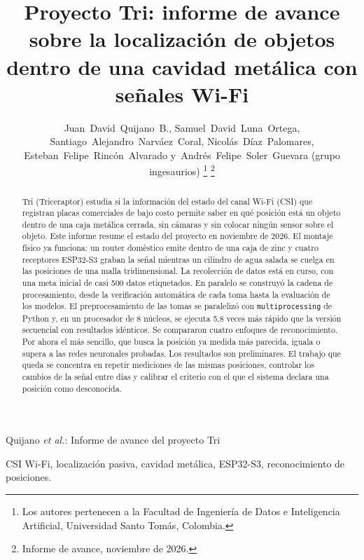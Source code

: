 \documentclass[10pt,journal]{IEEEtran}
\begin{document}
\title{Proyecto Tri: informe de avance sobre la localización de objetos dentro de una cavidad metálica con señales Wi-Fi}

\author{Juan~David~Quijano~B., Samuel~David~Luna~Ortega, Santiago~Alejandro~Narváez~Coral,
        Nicolás~Díaz~Palomares, Esteban~Felipe~Rincón~Alvarado
        y~Andrés~Felipe~Soler~Guevara (grupo ingesaurios)%
\thanks{Los autores pertenecen a la Facultad de Ingeniería de Datos e Inteligencia Artificial, Universidad Santo Tomás, Colombia.}%
\thanks{Informe de avance, noviembre de 2026.}}

%
{Quijano \MakeLowercase{\textit{et al.}}: Informe de avance del proyecto Tri}

\maketitle

\begin{abstract}
Tri (Triceraptor) estudia si la información del estado del canal Wi-Fi (CSI) que registran placas comerciales de bajo costo permite saber en qué posición está un objeto dentro de una caja metálica cerrada, sin cámaras y sin colocar ningún sensor sobre el objeto. Este informe resume el estado del proyecto en noviembre de 2026. El montaje físico ya funciona: un router doméstico emite dentro de una caja de zinc y cuatro receptores ESP32-S3 graban la señal mientras un cilindro de agua salada se cuelga en las posiciones de una malla tridimensional. La recolección de datos está en curso, con una meta inicial de casi 500 datos etiquetados. En paralelo se construyó la cadena de procesamiento, desde la verificación automática de cada toma hasta la evaluación de los modelos. El preprocesamiento de las tomas se paralelizó con \texttt{multiprocessing} de Python y, en un procesador de 8 núcleos, se ejecuta 5,8 veces más rápido que la versión secuencial con resultados idénticos. Se compararon cuatro enfoques de reconocimiento. Por ahora el más sencillo, que busca la posición ya medida más parecida, iguala o supera a las redes neuronales probadas. Los resultados son preliminares. El trabajo que queda se concentra en repetir mediciones de las mismas posiciones, controlar los cambios de la señal entre días y calibrar el criterio con el que el sistema declara una posición como desconocida.
\end{abstract}

\begin{IEEEkeywords}
CSI Wi-Fi, localización pasiva, cavidad metálica, ESP32-S3, reconocimiento de posiciones.
\end{IEEEkeywords}
\end{document}
